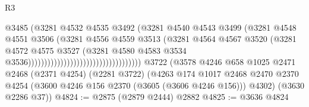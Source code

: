 \begin{lexlean}{R3}
\begin{coremodule}
                                                            @3485
                                                            (@3281
                                                              @4532
                                                              @4535
                                                              @3492
                                                              (@3281
                                                                @4540
                                                                @4543
                                                                @3499
                                                                (@3281
                                                                  @4548
                                                                  @4551
                                                                  @3506
                                                                  (@3281
                                                                    @4556
                                                                    @4559
                                                                    @3513
                                                                    (@3281
                                                                      @4564
                                                                      @4567
                                                                      @3520
                                                                      (@3281
                                                                        @4572
                                                                        @4575
                                                                        @3527
                                                                        (@3281
                                                                          @4580
                                                                          @4583
                                                                          @3534
                                                                          @3536)))))))))))))))))))))))))))))))))))
    @3722
    (@3578
      @4246
      @658
      @1025
      @2471
      @2468
      (@2371 @4254)
      (@2281 @3722)
      (@4263
        @174
        @1017
        @2468
        @2470
        @2370
        @4254
        (@3600 @4246 @156 @2370 (@3605 (@3606 @4246 @156)))
        @4302)
      (@3630 @2286 @37))
@4824 := @2875 (@2879 @2444) @2882
@4825 := @3636 @4824

\end{coremodule}
\end{lexlean}
